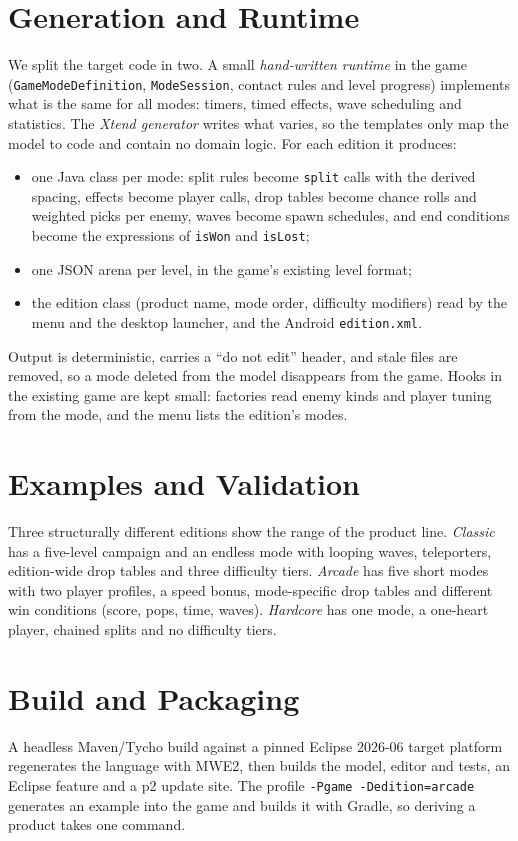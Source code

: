 \documentclass[conference]{IEEEtran}
\begin{document}
\section{Generation and Runtime}
We split the target code in two. A small \emph{hand-written runtime} in the game
(\texttt{GameModeDefinition}, \texttt{ModeSession}, contact rules and level progress) implements what
is the same for all modes: timers, timed effects, wave scheduling and statistics. The \emph{Xtend
generator} writes what varies, so the templates only map the model to code and contain no domain
logic. For each edition it produces:
\begin{itemize}
\item one Java class per mode: split rules become \texttt{split} calls with the derived spacing,
effects become player calls, drop tables become chance rolls and weighted picks per enemy, waves
become spawn schedules, and end conditions become the expressions of \texttt{isWon} and
\texttt{isLost};
\item one JSON arena per level, in the game's existing level format;
\item the edition class (product name, mode order, difficulty modifiers) read by the menu and the
desktop launcher, and the Android \texttt{edition.xml}.
\end{itemize}
Output is deterministic, carries a ``do not edit'' header, and stale files are removed, so a mode
deleted from the model disappears from the game. Hooks in the existing game are kept small: factories
read enemy kinds and player tuning from the mode, and the menu lists the edition's modes.

\section{Examples and Validation}
Three structurally different editions show the range of the product line. \emph{Classic} has a
five-level campaign and an endless mode with looping waves, teleporters, edition-wide drop tables and
three difficulty tiers. \emph{Arcade} has five short modes with two player profiles, a speed bonus,
mode-specific drop tables and different win conditions (score, pops, time, waves). \emph{Hardcore}
has one mode, a one-heart player, chained splits and no difficulty tiers. 

\section{Build and Packaging}
A headless Maven/Tycho build against a pinned Eclipse 2026-06 target platform regenerates the
language with MWE2, then builds the model, editor and tests, an Eclipse feature and a p2 update
site. The profile \texttt{-Pgame -Dedition=arcade} generates an example into the game and builds
it with Gradle, so deriving a product takes one command.
\end{document}
